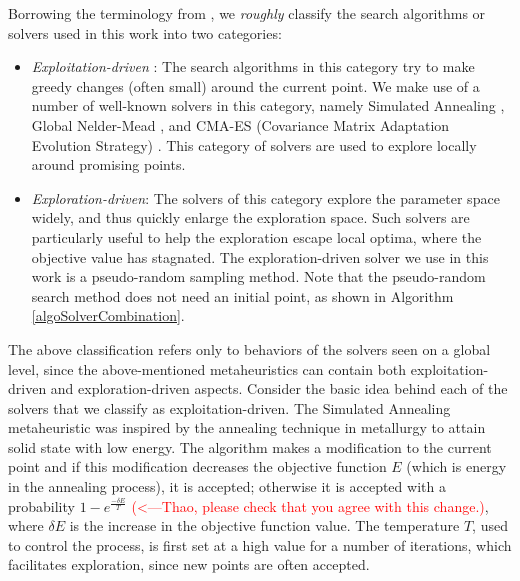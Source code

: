 Borrowing the terminology from \cite{dreo:hal-01341683}, we {\em roughly} classify the search algorithms or solvers used in this work into two categories: 
\begin{itemize}
\item {\em Exploitation-driven} : The search algorithms in this category try to make greedy changes (often small) around the current point. We make use of a number of well-known solvers in this category, namely Simulated Annealing \cite{Kirkpatrick83optimizationby}, Global Nelder-Mead \cite{NelderMead65}, and CMA-ES (Covariance Matrix Adaptation Evolution Strategy) \cite{hansen2006eda}. This category of solvers are used to explore locally around promising points. 
\item {\em Exploration-driven}: The solvers of this category explore the parameter space widely, and thus quickly enlarge the exploration space. Such solvers are particularly useful to help the exploration escape local optima, where the objective value has stagnated. The exploration-driven solver we use in this work is a pseudo-random sampling method. Note that the pseudo-random search method does not need an initial point, as shown in Algorithm \ref{algoSolverCombination}. 
\end{itemize}
The above classification refers only to behaviors of the solvers seen on a global level, since the above-mentioned metaheuristics can contain both exploitation-driven and exploration-driven aspects. Consider the basic idea behind each of the solvers that we classify as exploitation-driven. 
The Simulated Annealing metaheuristic \cite{Kirkpatrick83optimizationby} was inspired by the annealing technique in metallurgy to attain solid state with low energy. The algorithm makes a modification to the current point and if this modification decreases the objective function $E$ (which is energy in the annealing process), it is accepted; otherwise it is accepted with a probability $1-e^{\frac{-\delta E}{T}}$ \textcolor{red}{(<---Thao, please check that you agree with this change.)}, where $\delta E$ is the increase in the objective function value. The temperature $T$, used to control the process, is first set at a high value for a number of iterations, which facilitates exploration, since new points are often accepted.
